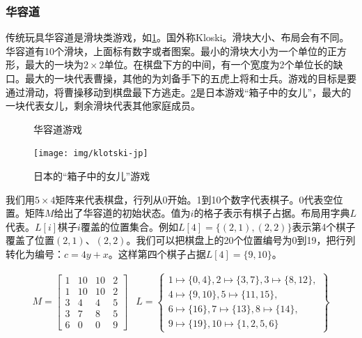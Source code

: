 \documentclass[b5paper]{ctexart}
\begin{document}
\subsubsection{华容道}

传统玩具华容道是滑块类游戏，如\cref{fig:klotski-cn}。国外称Kloski。滑块大小、布局会有不同。华容道有10个滑块，上面标有数字或者图案。最小的滑块大小为一个单位的正方形，最大的一块为$2 \times 2$单位。在棋盘下方的中间，有一个宽度为2个单位长的缺口。最大的一块代表曹操，其他的为刘备手下的五虎上将和士兵。游戏的目标是要通过滑动，将曹操移动到棋盘最下方逃走。\cref{fig:klotski-jp}是日本游戏“箱子中的女儿”，最大的一块代表女儿，剩余滑块代表其他家庭成员。

\begin{figure}[htbp]
 \centering
  \hspace{.01\textwidth}
 \caption{华容道游戏}
 \label{fig:klotski-cn}
\end{figure}

\begin{figure}[htbp]
 \centering
 \texttt{[image: img/klotski-jp]}
 \caption{日本的“箱子中的女儿”游戏}
 \label{fig:klotski-jp}
\end{figure}

我们用$5 \times 4$矩阵来代表棋盘，行列从0开始。1到10个数字代表棋子。0代表空位置。矩阵$M$给出了华容道的初始状态。值为$i$的格子表示有棋子占据。布局用字典$L$代表。$L[i]$棋子$i$覆盖的位置集合。例如$L[4] = \{(2, 1), (2, 2)\}$表示第4个棋子覆盖了位置$(2, 1)$、$(2, 2)$。我们可以把棋盘上的20个位置编号为0到19，把行列转化为编号：$c = 4y + x$。这样第四个棋子占据$L[4] = \{9, 10\}$。

\[
\begin{array}{cc}
M = \left [
  \begin{array}{cccc}
  1 & 10 & 10 & 2 \\
  1 & 10 & 10 & 2 \\
  3 & 4 & 4 & 5 \\
  3 & 7 & 8 & 5 \\
  6 & 0 & 0 & 9
  \end{array}
\right ] &
L = \left \{
  \begin{array}{l}
  1 \mapsto \{0, 4\}, 2 \mapsto \{3, 7\}, 3 \mapsto \{8, 12\}, \\
  4 \mapsto \{9, 10\}, 5 \mapsto \{11, 15\}, \\
  6 \mapsto \{16\}, 7 \mapsto \{ 13 \}, 8 \mapsto \{ 14 \}, \\
  9 \mapsto \{ 19 \}, 10 \mapsto \{1, 2, 5, 6\}
  \end{array}
\right \}
\end{array}
\]
\end{document}
